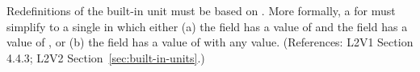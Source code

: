 Redefinitions of the built-in unit  must be based on
.  More formally, a \UnitDefinition for  must
simplify to a single \Unit in which either (a) the  field has a
value of  and the  field has a value of
, or (b) the  field has a value of
 with any  value.  (References: L2V1
Section 4.4.3; L2V2 Section~\ref{sec:built-in-units}.)
